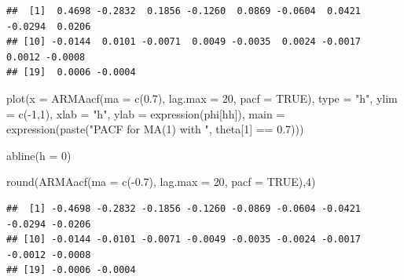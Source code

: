\documentclass[
]{book}
\newenvironment{Shaded}{\begin{snugshade}}{\end{snugshade}}
\newcommand{\AttributeTok}[1]{\textcolor[rgb]{0.77,0.63,0.00}{#1}}
\newcommand{\ConstantTok}[1]{\textcolor[rgb]{0.00,0.00,0.00}{#1}}
\newcommand{\DecValTok}[1]{\textcolor[rgb]{0.00,0.00,0.81}{#1}}
\newcommand{\FloatTok}[1]{\textcolor[rgb]{0.00,0.00,0.81}{#1}}
\newcommand{\FunctionTok}[1]{\textcolor[rgb]{0.00,0.00,0.00}{#1}}
\newcommand{\NormalTok}[1]{#1}
\newcommand{\SpecialCharTok}[1]{\textcolor[rgb]{0.00,0.00,0.00}{#1}}
\newcommand{\StringTok}[1]{\textcolor[rgb]{0.31,0.60,0.02}{#1}}
\theoremstyle{definition}
\theoremstyle{definition}
\theoremstyle{definition}
\theoremstyle{definition}
\theoremstyle{remark}
\begin{document}
\begin{verbatim}
##  [1]  0.4698 -0.2832  0.1856 -0.1260  0.0869 -0.0604  0.0421 -0.0294  0.0206
## [10] -0.0144  0.0101 -0.0071  0.0049 -0.0035  0.0024 -0.0017  0.0012 -0.0008
## [19]  0.0006 -0.0004
\end{verbatim}

\begin{Shaded}
\begin{Highlighting}[]
\FunctionTok{plot}\NormalTok{(}\AttributeTok{x =} \FunctionTok{ARMAacf}\NormalTok{(}\AttributeTok{ma =} \FunctionTok{c}\NormalTok{(}\FloatTok{0.7}\NormalTok{), }\AttributeTok{lag.max =} \DecValTok{20}\NormalTok{, }\AttributeTok{pacf =} \ConstantTok{TRUE}\NormalTok{), }\AttributeTok{type =} \StringTok{"h"}\NormalTok{, }\AttributeTok{ylim =} \FunctionTok{c}\NormalTok{(}\SpecialCharTok{{-}}\DecValTok{1}\NormalTok{,}\DecValTok{1}\NormalTok{), }\AttributeTok{xlab =} \StringTok{"h"}\NormalTok{, }\AttributeTok{ylab =} \FunctionTok{expression}\NormalTok{(phi[hh]),}
       \AttributeTok{main =} \FunctionTok{expression}\NormalTok{(}\FunctionTok{paste}\NormalTok{(}\StringTok{"PACF for MA(1) with "}\NormalTok{, theta[}\DecValTok{1}\NormalTok{] }\SpecialCharTok{==} \FloatTok{0.7}\NormalTok{)))}
  
\FunctionTok{abline}\NormalTok{(}\AttributeTok{h =} \DecValTok{0}\NormalTok{)}

\FunctionTok{round}\NormalTok{(}\FunctionTok{ARMAacf}\NormalTok{(}\AttributeTok{ma =} \FunctionTok{c}\NormalTok{(}\SpecialCharTok{{-}}\FloatTok{0.7}\NormalTok{), }\AttributeTok{lag.max =} \DecValTok{20}\NormalTok{, }\AttributeTok{pacf =} \ConstantTok{TRUE}\NormalTok{),}\DecValTok{4}\NormalTok{) }
\end{Highlighting}
\end{Shaded}

\begin{verbatim}
##  [1] -0.4698 -0.2832 -0.1856 -0.1260 -0.0869 -0.0604 -0.0421 -0.0294 -0.0206
## [10] -0.0144 -0.0101 -0.0071 -0.0049 -0.0035 -0.0024 -0.0017 -0.0012 -0.0008
## [19] -0.0006 -0.0004
\end{verbatim}
\end{document}
